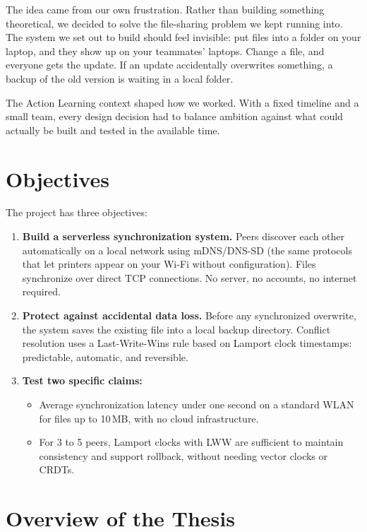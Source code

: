 The idea came from our own frustration. Rather than building something theoretical, we decided to solve the file-sharing problem we kept running into. The system we set out to build should feel invisible: put files into a folder on your laptop, and they show up on your teammates' laptops. Change a file, and everyone gets the update. If an update accidentally overwrites something, a backup of the old version is waiting in a local folder.

The Action Learning context shaped how we worked. With a fixed timeline and a small team, every design decision had to balance ambition against what could actually be built and tested in the available time.

\section{Objectives}

The project has three objectives:

\begin{enumerate}
    \item \textbf{Build a serverless synchronization system.} Peers discover each other automatically on a local network using mDNS/DNS-SD (the same protocols that let printers appear on your Wi-Fi without configuration). Files synchronize over direct TCP connections. No server, no accounts, no internet required.

    \item \textbf{Protect against accidental data loss.} Before any synchronized overwrite, the system saves the existing file into a local backup directory. Conflict resolution uses a Last-Write-Wins rule based on Lamport clock timestamps: predictable, automatic, and reversible.

    \item \textbf{Test two specific claims:}
    \begin{itemize}
        \item[$H_1$:] Average synchronization latency under one second on a standard WLAN for files up to 10\,MB, with no cloud infrastructure.
        \item[$H_2$:] For 3 to 5 peers, Lamport clocks with LWW are sufficient to maintain consistency and support rollback, without needing vector clocks or CRDTs.
    \end{itemize}
\end{enumerate}

\section{Overview of the Thesis}

